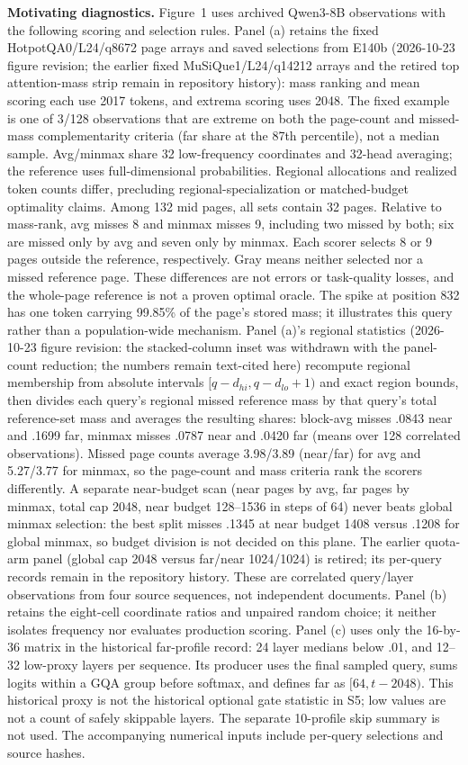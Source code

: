 \documentclass[10pt,letterpaper]{article}
\begin{document}
\textbf{Motivating diagnostics.} Figure~1 uses archived Qwen3-8B observations with the following scoring and selection rules. Panel (a) retains the fixed HotpotQA0/L24/q8672 page arrays and saved selections from E140b (2026-10-23 figure revision; the earlier fixed MuSiQue1/L24/q14212 arrays and the retired top attention-mass strip remain in repository history): mass ranking and mean scoring each use 2017 tokens, and extrema scoring uses 2048. The fixed example is one of 3/128 observations that are extreme on both the page-count and missed-mass complementarity criteria (far share at the 87th percentile), not a median sample. Avg/minmax share 32 low-frequency coordinates and 32-head averaging; the reference uses full-dimensional probabilities. Regional allocations and realized token counts differ, precluding regional-specialization or matched-budget optimality claims. Among 132 mid pages, all sets contain 32 pages. Relative to mass-rank, avg misses 8 and minmax misses 9, including two missed by both; six are missed only by avg and seven only by minmax. Each scorer selects 8 or 9 pages outside the reference, respectively. Gray means neither selected nor a missed reference page. These differences are not errors or task-quality losses, and the whole-page reference is not a proven optimal oracle. The spike at position 832 has one token carrying 99.85\% of the page's stored mass; it illustrates this query rather than a population-wide mechanism. Panel (a)'s regional statistics (2026-10-23 figure revision: the stacked-column inset was withdrawn with the panel-count reduction; the numbers remain text-cited here) recompute regional membership from absolute intervals $[q-d_{hi},q-d_{lo}+1)$ and exact region bounds, then divides each query's regional missed reference mass by that query's total reference-set mass and averages the resulting shares: block-avg misses .0843 near and .1699 far, minmax misses .0787 near and .0420 far (means over 128 correlated observations). Missed page counts average 3.98/3.89 (near/far) for avg and 5.27/3.77 for minmax, so the page-count and mass criteria rank the scorers differently. A separate near-budget scan (near pages by avg, far pages by minmax, total cap 2048, near budget 128--1536 in steps of 64) never beats global minmax selection: the best split misses .1345 at near budget 1408 versus .1208 for global minmax, so budget division is not decided on this plane. The earlier quota-arm panel (global cap 2048 versus far/near 1024/1024) is retired; its per-query records remain in the repository history. These are correlated query/layer observations from four source sequences, not independent documents. Panel (b) retains the eight-cell coordinate ratios and unpaired random choice; it neither isolates frequency nor evaluates production scoring. Panel (c) uses only the 16-by-36 matrix in the historical far-profile record: 24 layer medians below .01, and 12--32 low-proxy layers per sequence. Its producer uses the final sampled query, sums logits within a GQA group before softmax, and defines far as $[64,t-2048)$. This historical proxy is not the historical optional gate statistic in S5; low values are not a count of safely skippable layers. The separate 10-profile skip summary is not used. The accompanying numerical inputs include per-query selections and source hashes.
\end{document}
